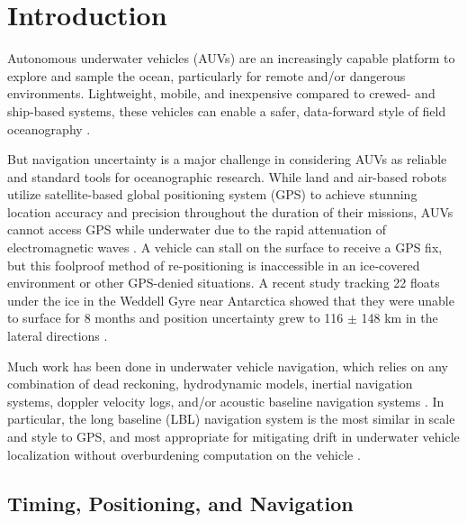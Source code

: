 \maketitle


\section{\label{sec:1} Introduction} 

Autonomous underwater vehicles (AUVs) are an increasingly capable platform to explore and sample the ocean, particularly for remote and/or dangerous environments.
Lightweight, mobile, and inexpensive compared to crewed- and ship-based systems, these vehicles can enable a safer, data-forward style of field oceanography \citep{bellingham_robotics_2007,petillot_underwater_2019}.

But navigation uncertainty is a major challenge in considering AUVs as reliable and standard tools for oceanographic research.
While land and air-based robots utilize satellite-based global positioning system (GPS) to achieve stunning location accuracy and precision throughout the duration of their missions, AUVs cannot access GPS while underwater due to the rapid attenuation of electromagnetic waves \citep{preisig_acoustic_2007}.
A vehicle can stall on the surface to receive a GPS fix, but this foolproof method of re-positioning is inaccessible in an ice-covered environment or other GPS-denied situations.
A recent study tracking 22 floats under the ice in the Weddell Gyre near Antarctica showed that they were unable to surface for 8 months and position uncertainty grew to 116 $\pm$ 148 km in the lateral directions \citep{chamberlain_observing_2018}.

Much work has been done in underwater vehicle navigation, which relies on any combination of dead reckoning, hydrodynamic models, inertial navigation systems, doppler velocity logs, and/or acoustic baseline navigation systems \citep{paull_auv_2014}.
In particular, the long baseline (LBL) navigation system is the most similar in scale and style to GPS, and most appropriate for mitigating drift in underwater vehicle localization without overburdening computation on the vehicle \citep{van_uffelen_global_2021}.

\subsection{Timing, Positioning, and Navigation}

